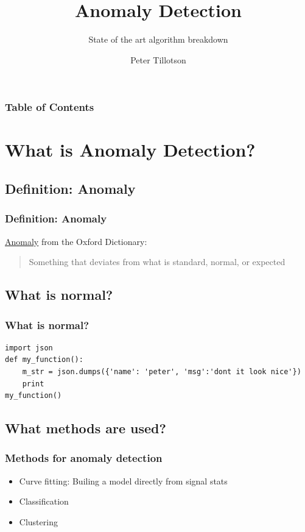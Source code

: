 \documentclass[aspectratio=169]{beamer}
\author{Peter Tillotson}
\institute{ Acumed Training }
\title{Anomaly Detection}
\subtitle{State of the art algorithm breakdown}
\begin{document}
\frame{\titlepage}


\begin{frame}
	\frametitle{Table of Contents}
	\tableofcontents[hideallsubsections]
\end{frame}

\section{What is Anomaly Detection?}
\subsection{Definition: Anomaly}
\begin{frame}
\frametitle{Definition: Anomaly}
\href{http://www.oxforddictionaries.com/definition/english/anomaly}{Anomaly} from the Oxford Dictionary:
\begin{quote}
	Something that deviates from what is standard, normal, or expected
\end{quote}

\end{frame}

\subsection{What is normal?}
\begin{frame}[fragile]
\frametitle{What is normal?}
\begin{lstlisting}
import json
def my_function():
	m_str = json.dumps({'name': 'peter', 'msg':'dont it look nice'})
	print 
my_function()
\end{lstlisting}
\cite{data:yahoo}
\end{frame}

\subsection{What methods are used?}
\begin{frame}
\frametitle{Methods for anomaly detection}
\begin{itemize}
\item Curve fitting: Builing a model directly from signal stats 
\item Classification
\item Clustering 
\end{itemize}
\end{frame}
\end{document}
